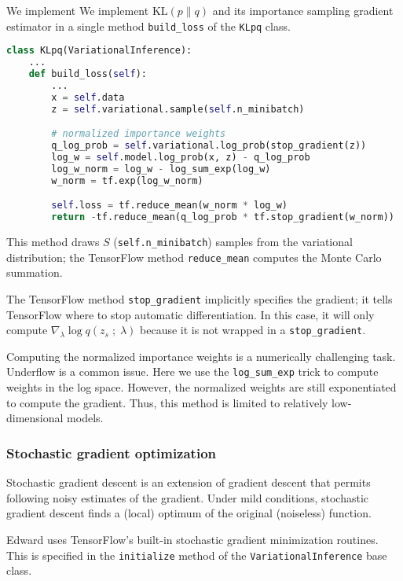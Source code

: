 We implement
We implement $\text{KL}(p\|q)$ and its importance sampling gradient
estimator in a single method \texttt{build_loss} of the \texttt{KLpq} class.
\begin{lstlisting}[language=Python]
class KLpq(VariationalInference):
    ...
    def build_loss(self):
        ...
        x = self.data
        z = self.variational.sample(self.n_minibatch)

        # normalized importance weights
        q_log_prob = self.variational.log_prob(stop_gradient(z))
        log_w = self.model.log_prob(x, z) - q_log_prob
        log_w_norm = log_w - log_sum_exp(log_w)
        w_norm = tf.exp(log_w_norm)

        self.loss = tf.reduce_mean(w_norm * log_w)
        return -tf.reduce_mean(q_log_prob * tf.stop_gradient(w_norm))
\end{lstlisting}

This method draws $S$ (\texttt{self.n_minibatch}) samples from the variational
distribution; the TensorFlow method \texttt{reduce_mean} computes the Monte
Carlo summation. 

The TensorFlow method \texttt{stop_gradient} implicitly specifies the gradient; 
it tells TensorFlow where to stop automatic differentiation. In
this case, it will only compute $\nabla_\lambda \log q(z_s\;;\;\lambda)$ because
it is not wrapped in a \texttt{stop_gradient}.

Computing the normalized importance weights is a numerically challenging task.
Underflow is a common issue. Here we use the \texttt{log_sum_exp} trick to
compute weights in the log space. However, the normalized weights are still
exponentiated to compute the gradient. Thus, this method is limited to
relatively low-dimensional models.

\subsubsection{Stochastic gradient optimization}

Stochastic gradient descent is an extension of gradient descent that permits
following noisy estimates of the gradient. Under mild conditions, stochastic
gradient descent finds a (local) optimum of the original (noiseless) function.

Edward uses TensorFlow's built-in stochastic gradient minimization routines.
This is specified in the \texttt{initialize} method of the 
\texttt{VariationalInference} base class.


